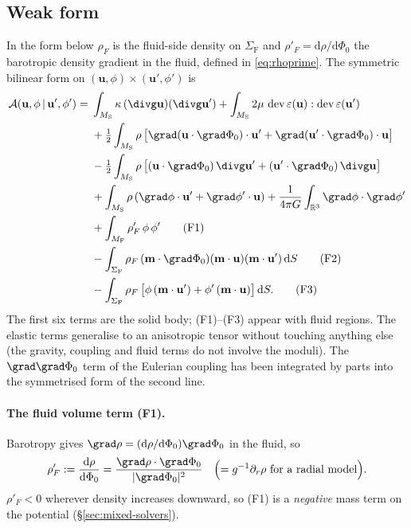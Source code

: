 \documentclass[11pt]{article}
\numberwithin{equation}{section}
\theoremstyle{remark}
\newcommand{\R}{\mathbb{R}}
\newcommand{\eps}{\varepsilon}
\newcommand{\dS}{\,\mathrm{d}S}
\newcommand{\dev}{\operatorname{dev}}
\newcommand{\vu}{\mathbf{u}}
\newcommand{\vm}{\mathbf{m}}
\newcommand{\MS}{M_{\mathrm{S}}}
\newcommand{\MF}{M_{\mathrm{F}}}
\newcommand{\SF}{\Sigma_{\mathrm{F}}}
\begin{document}
\subsection{Weak form}

In the form below $\rho_F$ is the fluid-side density on $\SF$ and
$\rho'_F = \mathrm{d}\rho/\mathrm{d}\Phi_0$ the barotropic density gradient
in the fluid, defined in \eqref{eq:rhoprime}. The symmetric bilinear form
on $(\vu,\phi)\times(\vu',\phi')$ is
\begin{align}
  \mathcal{A}(\vu,\phi\,|\,\vu',\phi') ={}&
    \int_{\MS} \kappa\,(\divg\vu)(\divg\vu') + \int_{\MS} 2\mu\,
      \dev\eps(\vu):\dev\eps(\vu') \nonumber\\
  &+ \tfrac12\int_{\MS}\rho\,\bigl[\grad(\vu\cdot\grad\Phi_0)\cdot\vu'
      + \grad(\vu'\cdot\grad\Phi_0)\cdot\vu\bigr] \nonumber\\
  &- \tfrac12\int_{\MS}\rho\,\bigl[(\vu\cdot\grad\Phi_0)\,\divg\vu'
      + (\vu'\cdot\grad\Phi_0)\,\divg\vu\bigr] \nonumber\\
  &+ \int_{\MS}\rho\,(\grad\phi\cdot\vu' + \grad\phi'\cdot\vu)
   + \frac{1}{4\pi G}\int_{\R^3}\grad\phi\cdot\grad\phi'
  \label{eq:mixedA}\\
  &+ \int_{\MF}\rho'_F\,\phi\,\phi'
  \tag{F1}\\
  &- \int_{\SF}\rho_F\,(\vm\cdot\grad\Phi_0)(\vm\cdot\vu)(\vm\cdot\vu')\dS
  \tag{F2}\\
  &- \int_{\SF}\rho_F\,\bigl[\phi\,(\vm\cdot\vu') + \phi'\,(\vm\cdot\vu)\bigr]\dS .
  \tag{F3}
\end{align}
The first six terms are the solid body; (F1)--(F3) appear with fluid
regions. The elastic terms generalise to an anisotropic tensor without
touching anything else (the gravity, coupling and fluid terms do not
involve the moduli). The $\grad\grad\Phi_0$ term of the Eulerian coupling
has been integrated by parts into the symmetrised form of the second line.

\paragraph{The fluid volume term (F1).} Barotropy gives $\grad\rho =
(\mathrm{d}\rho/\mathrm{d}\Phi_0)\grad\Phi_0$ in the fluid, so
\begin{equation}
  \rho'_F := \frac{\mathrm{d}\rho}{\mathrm{d}\Phi_0}
         = \frac{\grad\rho\cdot\grad\Phi_0}{|\grad\Phi_0|^2}
         \quad\Bigl( = g^{-1}\partial_r\rho \text{ for a radial model}\Bigr).
  \label{eq:rhoprime}
\end{equation}
$\rho'_F < 0$ wherever density increases downward, so (F1) is a
\emph{negative} mass term on the potential (\S\ref{sec:mixed-solvers}).
\end{document}
